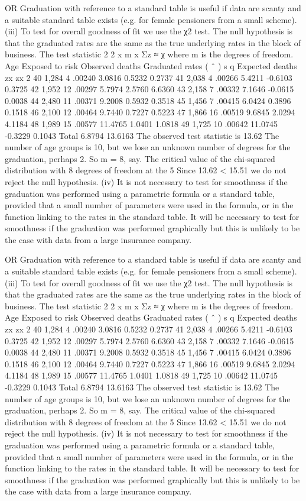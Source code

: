 OR
Graduation with reference to a standard table is useful if data are scanty and a
suitable standard table exists (e.g. for female pensioners from a small scheme).
(iii) To test for overall goodness of fit we use the χ2 test.
The null hypothesis is that the graduated rates are the same as the true underlying
rates in the block of business.
The test statistic 2 2
x m
x
Σz ≈ χ where m is the degrees of freedom.
Age Exposed
to risk
Observed
deaths
Graduated
rates ( ˆ ) s q
Expected
deaths
zx zx
2
40 1,284 4 .00240 3.0816 0.5232 0.2737
41 2,038 4 .00266 5.4211 -0.6103 0.3725
42 1,952 12 .00297 5.7974 2.5760 6.6360
43 2,158 7 .00332 7.1646 -0.0615 0.0038
44 2,480 11 .00371 9.2008 0.5932 0.3518
45 1,456 7 .00415 6.0424 0.3896 0.1518
46 2,100 12 .00464 9.7440 0.7227 0.5223
47 1,866 16 .00519 9.6845 2.0294 4.1184
48 1,989 15 .00577 11.4765 1.0401 1.0818
49 1,725 10 .00642 11.0745 -0.3229 0.1043
Total 6.8794 13.6163
The observed test statistic is 13.62
The number of age groups is 10, but we lose an unknown number of degrees for the
graduation, perhaps 2. So m = 8, say.
The critical value of the chi-squared distribution with 8 degrees of
freedom at the 5%
Since 13.62 < 15.51
we do not reject the null hypothesis.
(iv) It is not necessary to test for smoothness if the graduation was performed using a
parametric formula or a standard table, provided that a small number of parameters
were used in the formula, or in the function linking to the rates in the standard table.
It will be necessary to test for smoothness if the graduation was performed graphically
but this is unlikely to be the case with data from a large insurance company.

OR
Graduation with reference to a standard table is useful if data are scanty and a
suitable standard table exists (e.g. for female pensioners from a small scheme).
(iii) To test for overall goodness of fit we use the χ2 test.
The null hypothesis is that the graduated rates are the same as the true underlying
rates in the block of business.
The test statistic 2 2
x m
x
Σz ≈ χ where m is the degrees of freedom.
Age Exposed
to risk
Observed
deaths
Graduated
rates ( ˆ ) s q
Expected
deaths
zx zx
2
40 1,284 4 .00240 3.0816 0.5232 0.2737
41 2,038 4 .00266 5.4211 -0.6103 0.3725
42 1,952 12 .00297 5.7974 2.5760 6.6360
43 2,158 7 .00332 7.1646 -0.0615 0.0038
44 2,480 11 .00371 9.2008 0.5932 0.3518
45 1,456 7 .00415 6.0424 0.3896 0.1518
46 2,100 12 .00464 9.7440 0.7227 0.5223
47 1,866 16 .00519 9.6845 2.0294 4.1184
48 1,989 15 .00577 11.4765 1.0401 1.0818
49 1,725 10 .00642 11.0745 -0.3229 0.1043
Total 6.8794 13.6163
The observed test statistic is 13.62
The number of age groups is 10, but we lose an unknown number of degrees for the
graduation, perhaps 2. So m = 8, say.
The critical value of the chi-squared distribution with 8 degrees of
freedom at the 5%
Since 13.62 < 15.51
we do not reject the null hypothesis.
(iv) It is not necessary to test for smoothness if the graduation was performed using a
parametric formula or a standard table, provided that a small number of parameters
were used in the formula, or in the function linking to the rates in the standard table.
It will be necessary to test for smoothness if the graduation was performed graphically
but this is unlikely to be the case with data from a large insurance company.
